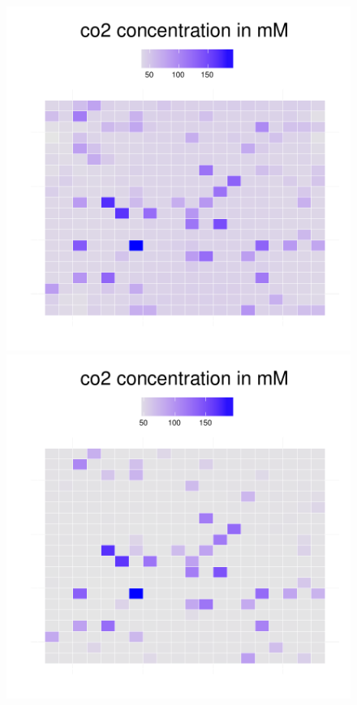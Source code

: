 \begin{figure}[h!]
{\begin{minipage}[t]{0.3\textwidth}
  \end{minipage}
  \begin{minipage}[t]{0.3\textwidth}
    \includegraphics[width=\textwidth]{../results/ecoli_20x20_aerob_seed55_co235.pdf}
  \end{minipage}
  \begin{minipage}[t]{0.3\textwidth}
    \includegraphics[width=\textwidth]{../results/ecoli_20x20_aerob_seed55_co250.pdf}

\end{minipage}}
\end{figure}

